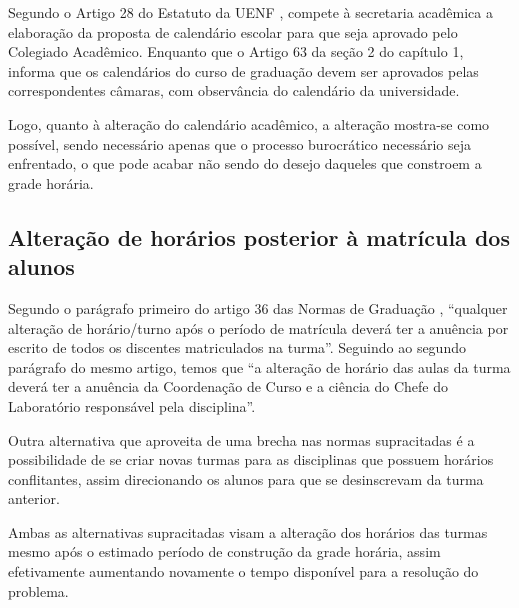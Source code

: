 
Segundo o Artigo 28 do Estatuto da UENF \cite{Estatuto2002}, compete à secretaria acadêmica a elaboração da proposta de calendário escolar para que seja aprovado pelo Colegiado Acadêmico. Enquanto que o Artigo 63 da seção 2 do capítulo 1, informa que os calendários do curso de graduação devem ser aprovados pelas correspondentes câmaras, com observância do calendário da universidade.

Logo, quanto à alteração do calendário acadêmico, a alteração mostra-se como possível, sendo necessário apenas que o processo burocrático necessário seja enfrentado, o que pode acabar não sendo do desejo daqueles que constroem a grade horária.

\subsection{Alteração de horários posterior à matrícula dos alunos} \label{ssec:burocracia-troca} %

Segundo o parágrafo primeiro do artigo 36 das Normas de Graduação \cite{Normas2012}, ``qualquer alteração de horário/turno após o período de matrícula deverá ter a anuência por escrito de todos os discentes matriculados na turma''. Seguindo ao segundo parágrafo do mesmo artigo, temos que ``a alteração de horário das aulas da turma deverá ter a anuência da Coordenação de Curso e a ciência do Chefe do Laboratório responsável pela disciplina''.

Outra alternativa que aproveita de uma brecha nas normas supracitadas é a possibilidade de se criar novas turmas para as disciplinas que possuem horários conflitantes, assim direcionando os alunos para que se desinscrevam da turma anterior.

Ambas as alternativas supracitadas visam a alteração dos horários das turmas mesmo após o estimado período de construção da grade horária, assim efetivamente aumentando novamente o tempo disponível para a resolução do problema.


